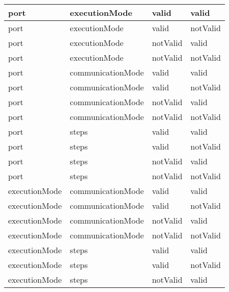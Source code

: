 \begin{table}[H]
\begin{tabular}{llll}
        port              & executionMode     & valid           & valid           \\
        \hline
        port              & executionMode     & valid           & notValid        \\
        \hline
        port              & executionMode     & notValid        & valid           \\
        \hline
        port              & executionMode     & notValid        & notValid        \\
        \hline
        port              & communicationMode & valid           & valid           \\
        \hline
        port              & communicationMode & valid           & notValid        \\
        \hline
        port              & communicationMode & notValid        & valid           \\
        \hline
        port              & communicationMode & notValid        & notValid        \\
        \hline
        port              & steps             & valid           & valid           \\
        \hline
        port              & steps             & valid           & notValid        \\
        \hline
        port              & steps             & notValid        & valid           \\
        \hline
        port              & steps             & notValid        & notValid        \\
        \hline
        executionMode     & communicationMode & valid           & valid           \\
        \hline
        executionMode     & communicationMode & valid           & notValid        \\
        \hline
        executionMode     & communicationMode & notValid        & valid           \\
        \hline
        executionMode     & communicationMode & notValid        & notValid        \\
        \hline
        executionMode     & steps             & valid           & valid           \\
        \hline
        executionMode     & steps             & valid           & notValid        \\
        \hline
        executionMode     & steps             & notValid        & valid           \\

\end{tabular}
\end{table}

